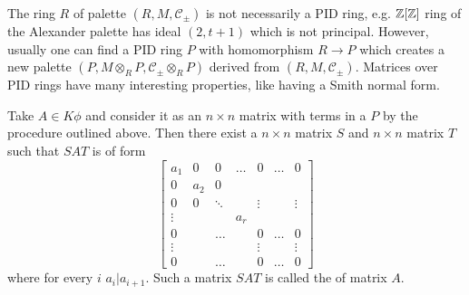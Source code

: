 The ring $R$ of palette $(R, M, \mathcal{C}_\pm)$ is not necessarily a PID ring, e.g. $\operatorname{\mathbb{Z}}[\operatorname{\mathbb{Z}}]$ ring of the Alexander palette has ideal $(2, t+1)$ which is not principal. However, usually one can find a PID ring $P$ with homomorphism $R\to P$ which creates a new palette $(P, M\otimes_R P, \mathcal{C}_\pm\otimes_R P)$ derived from $(R, M, \mathcal{C}_\pm)$. Matrices over PID rings have many interesting properties, like having a Smith normal form.

\begin{definition}
Take $A\in K\phi$ and consider it as an $n\times n$ matrix with terms in a $P$ by the procedure outlined above. Then there exist a $n\times n$ matrix $S$ and $n\times n$ matrix $T$ such that $SAT$ is of form
$$
\begin{bmatrix}
  a_1 & 0 & 0 & \hdots & 0 & \hdots & 0 \\ 
  0 & a_2 & 0\\ 
  0 & 0 & \ddots & & \vdots & & \vdots\\ 
  \vdots & & & a_r\\ 
  0 & & \hdots & & 0 & \hdots & 0 \\ 
  \vdots & & & & \vdots & & \vdots\\ 
  0 & & \hdots & & 0 & \hdots & 0
\end{bmatrix}
$$
where for every $i$ $a_i|a_{i+1}$. Such a matrix $SAT$ is called the  of matrix $A$.
\end{definition}
